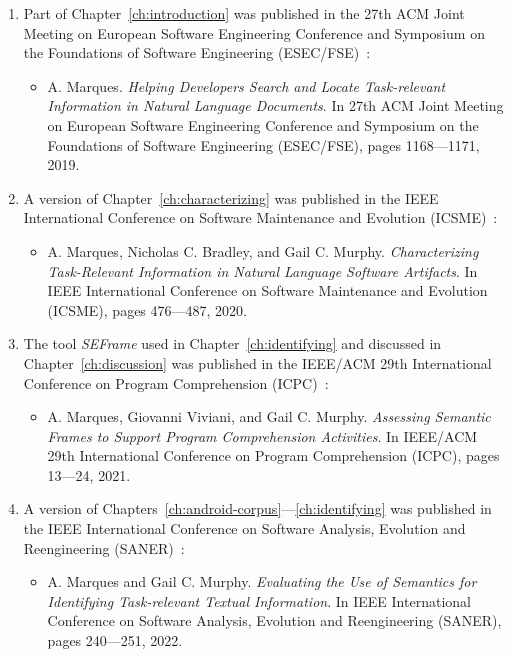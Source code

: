 \begin{enumerate}
    \item Part of Chapter~\ref{ch:introduction} was published in the 27th ACM Joint Meeting on European Software Engineering Conference and Symposium on the Foundations of Software Engineering (ESEC/FSE)~\cite{marques2019}:


    \begin{itemize}
        \item A. Marques.
            \textit{Helping Developers Search and Locate Task-relevant Information in Natural Language Documents}. 
            In 27th ACM Joint Meeting on European Software Engineering Conference and Symposium on the Foundations of Software Engineering (ESEC/FSE),
            pages 1168---1171, 2019.
    \end{itemize}        


\item A version of Chapter~\ref{ch:characterizing} was published in the IEEE  International Conference on Software Maintenance and Evolution (ICSME)~\cite{marques2020}:


    \begin{itemize}
        \item A. Marques, Nicholas C. Bradley, and Gail C. Murphy.
            \textit{Characterizing Task-Relevant Information in Natural Language Software Artifacts}. 
            In IEEE  International Conference on Software Maintenance and Evolution (ICSME),
            pages 476---487, 2020. 
    \end{itemize}

\item The tool \textit{SEFrame} used in Chapter~\ref{ch:identifying} and discussed in Chapter~\ref{ch:discussion} was published in the  IEEE/ACM 29th International Conference on Program Comprehension (ICPC)~\cite{marques2021}:


    \begin{itemize}
        \item A. Marques, Giovanni Viviani, and Gail C. Murphy.
            \textit{Assessing Semantic Frames to Support Program Comprehension Activities}. 
            In IEEE/ACM 29th International Conference on Program Comprehension (ICPC), 
            pages 13---24, 2021.
    \end{itemize}


\item A version of Chapters~\ref{ch:android-corpus}---\ref{ch:identifying} was published in the IEEE International Conference on Software Analysis, Evolution and Reengineering (SANER)~\cite{marques2022}: 


    \begin{itemize}
        \item A. Marques and Gail C. Murphy. 
            \textit{Evaluating the Use of Semantics for Identifying Task-relevant Textual Information}. 
            In IEEE International Conference on Software Analysis, Evolution and Reengineering (SANER),
            pages 240---251, 2022.
    \end{itemize}

\end{enumerate}



